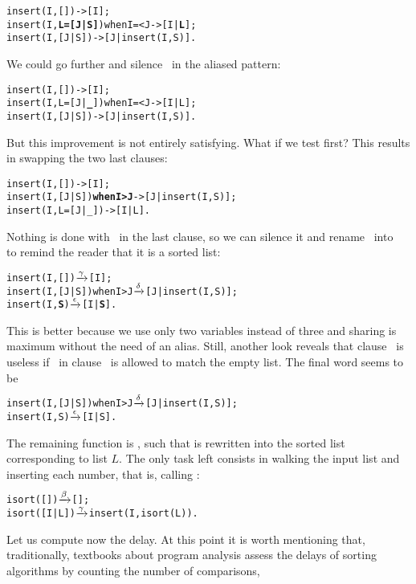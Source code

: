 \begin{alltt}
insert(I,   [])               -> [I];
insert(I,\textbf{L=[J|S]}) when I =< J -> [I|\textbf{L}];
insert(I,[J|S])               -> [J|insert(I,S)].
\end{alltt}
We could go further and silence~ in the aliased pattern:
\begin{alltt}
insert(I,   [])               -> [I];
insert(I,L=[J|\textbf{\_}]) when I =< J -> [I|L];
insert(I,[J|S])               -> [J|insert(I,S)].
\end{alltt}
But this improvement is not entirely satisfying. What if we test
 first? This results in swapping the two last clauses:
\begin{alltt}
insert(I,     [])            -> [I];
insert(I,  [J|S]) \textbf{when I > J} -> [J|insert(I,S)];
insert(I,L=[J|_])            -> [I|L].
\end{alltt}
Nothing is done with~ in the last clause, so we can silence
it and rename~ into~ to remind the reader that
it is a sorted list:
\begin{alltt}
insert(I,   [])            \(\smashedrightarrow{\gamma}\) [I];
insert(I,[J|S]) when I > J \(\smashedrightarrow{\delta}\) [J|insert(I,S)];
insert(I,    \textbf{S})            \(\smashedrightarrow{\epsilon}\) [I|\textbf{S}].
\end{alltt}
This is better because we use only two variables instead of three and
sharing is maximum without the need of an alias. Still, another look
reveals that clause~\clause{\gamma} is useless if~ in
clause~\clause{\epsilon} is allowed to match the empty list. The final
word seems to be\label{code:insert}
\begin{alltt}
insert(I,[J|S]) when I > J \(\smashedrightarrow{\delta}\) [J|insert(I,S)];
insert(I,    S)            \(\smashedrightarrow{\epsilon}\) [I|S].
\end{alltt}
The remaining function is , such that
 is rewritten into the sorted list
corresponding to list \(L\). The only task left consists in walking
the input list and inserting each number, that is, calling
:
\begin{alltt}
isort(   []) \(\smashedrightarrow{\beta}\) [];
isort([I|L]) \(\smashedrightarrow{\gamma}\) insert(I,isort(L)).
\end{alltt}
Let us compute now the delay. At this point it is worth mentioning
that, traditionally, textbooks about program analysis assess the
delays of sorting algorithms by counting the number of comparisons,
